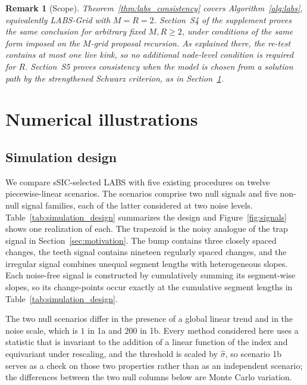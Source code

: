 \documentclass[12pt, a4paper]{article}
\newtheorem{remark}{Remark}[section]
\begin{document}
\begin{remark}[Scope]
\label{rem:scope}
{\em
Theorem~\ref{thm:labs_consistency} covers Algorithm~\ref{alg:labs}, equivalently LABS-Grid with $M=R=2$. Section~S4 of the supplement proves the same conclusion for arbitrary fixed $M,R\geq2$, under conditions of the same form imposed on the $M$-grid proposal recursion. As explained there, the re-test contains at most one live kink, so no additional node-level condition is required for $R$. Section~S5 proves consistency when the model is chosen from a solution path by the strengthened Schwarz criterion, as in Section~\ref{sec:simulations}.
}
\end{remark}


\section{Numerical illustrations}
\label{sec:simulations}

\subsection{Simulation design}

We compare sSIC-selected LABS with five existing procedures on twelve
piecewise-linear scenarios.  The scenarios comprise two null signals and five
non-null signal families, each of the latter considered at two noise levels.
Table~\ref{tab:simulation_design} summarizes the design and
Figure~\ref{fig:signals} shows one realization of each.  The trapezoid is the
noisy analogue of the trap signal in Section~\ref{sec:motivation}.  The bump
contains three closely spaced changes, the teeth signal contains nineteen
regularly spaced changes, and the irregular signal combines unequal segment
lengths with heterogeneous slopes.  Each noise-free signal is constructed by
cumulatively summing its segment-wise slopes, so its change-points occur
exactly at the cumulative segment lengths in Table~\ref{tab:simulation_design}.

The two null scenarios differ in the presence of a global linear trend and in
the noise scale, which is $1$ in 1a and $200$ in 1b.  Every method considered
here uses a statistic that is invariant to the addition of a linear function of
the index and equivariant under rescaling, and the threshold is scaled by
$\hat\sigma$, so scenario 1b serves as a check on those two properties rather
than as an independent scenario; the differences between the two null columns
below are Monte Carlo variation.
\end{document}
